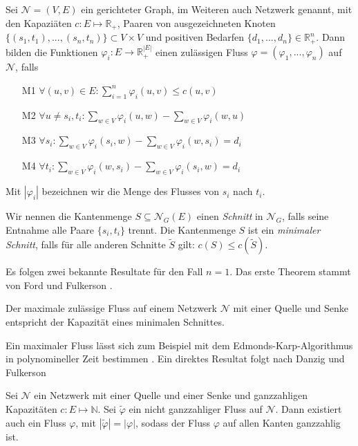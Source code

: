\begin{definition}\label{def_multi_flow}
Sei $\mathcal{N}=(V,E)$ ein gerichteter Graph, im Weiteren auch Netzwerk genannt, mit den Kapaziäten $c:E\mapsto\mathbb{R}_{+}$, Paaren von ausgezeichneten Knoten $\{(s_1,t_1), ... ,(s_n,t_n)\}\subset V \times V$ und positiven Bedarfen $\{d_1, ... ,d_n\} \in \mathbb{R}_+^n$. Dann bilden die Funktionen $\varphi_i: E \to \mathbb{R}_+^{|E|}$ einen zulässigen Fluss $\varphi=(\varphi_1, ... ,\varphi_n)$ auf $\mathcal{N}$, falls
\begin{itemize}
\item[M1] $\forall (u,v) \in E : \sum_{i=1}^{n}{\varphi_i(u,v)} \leq c(u,v) $
\item[M2] $ \forall u \neq s_i,t_i : \sum_{w \in V} \varphi_i(u,w) - \sum_{w \in V} \varphi_i(w,u) $
\item[M3] $ \forall s_i : \sum_{w \in V} \varphi_i(s_i,w) - \sum_{w \in V} \varphi_i(w,s_i) = d_i $
\item[M4] $ \forall t_i : \sum_{w \in V} \varphi_i(w,s_i) - \sum_{w \in V} \varphi_i(s_i,w) = d_i $
\end{itemize}
Mit $|\varphi_i|$ bezeichnen wir die Menge des Flusses von $s_i$ nach $t_i$.
\end{definition}

\begin{definition}
Wir nennen die Kantenmenge $S \subseteq \mathcal{N}_G(E)$ einen \textit{Schnitt} in $\mathcal{N}_G$, falls seine Entnahme alle Paare $\{s_i,t_i\}$ trennt. Die Kantenmenge $S$ ist ein \textit{minimaler Schnitt}, falls für alle anderen Schnitte $\tilde{S}$ gilt: $c(S) \leq c(\tilde{S})$.
\end{definition}

Es folgen zwei bekannte Resultate für den Fall $n=1$. Das erste Theorem stammt von Ford und Fulkerson \cite{ff09}.

\begin{theorem}
Der maximale zulässige Fluss auf einem Netzwerk $\mathcal{N}$ mit einer Quelle und Senke entspricht der Kapazität eines minimalen Schnittes.
\end{theorem}

Ein maximaler Fluss lässt sich zum Beispiel mit dem Edmonds-Karp-Algorithmus in polynomineller Zeit bestimmen \cite[Theorem 8.15]{korte12}. Ein direktes Resultat folgt nach Danzig und Fulkerson \cite{ff09}

\begin{theorem}\label{theo_int_flow}
Sei $\mathcal{N}$ ein Netzwerk mit einer Quelle und einer Senke und ganzzahligen Kapazitäten $c:E\mapsto\mathbb{N}$. Sei $\tilde{\varphi}$ ein nicht ganzzahliger Fluss auf $\mathcal{N}$. Dann existiert auch ein Fluss $\varphi$, mit $|\tilde{\varphi}| = |\varphi|$, sodass der Fluss $\varphi$ auf allen Kanten ganzzahlig ist.
\end{theorem}

